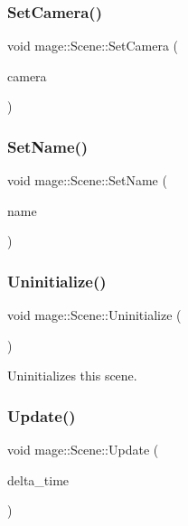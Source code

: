 \subsubsection{\texorpdfstring{Set\+Camera()}{SetCamera()}}
{\footnotesize\ttfamily void mage\+::\+Scene\+::\+Set\+Camera (\begin{DoxyParamCaption}\item[{\hyperlink{namespacemage_a1e01ae66713838a7a67d30e44c67703e}{Shared\+Ptr}$<$ \hyperlink{classmage_1_1_camera}{Camera} $>$}]{camera }\end{DoxyParamCaption})}

\hypertarget{classmage_1_1_scene_a9b7c1c2f84cc3b3c5ff3de4f29d830e9}{}\label{classmage_1_1_scene_a9b7c1c2f84cc3b3c5ff3de4f29d830e9} 
\subsubsection{\texorpdfstring{Set\+Name()}{SetName()}}
{\footnotesize\ttfamily void mage\+::\+Scene\+::\+Set\+Name (\begin{DoxyParamCaption}\item[{const string \&}]{name }\end{DoxyParamCaption})}

\hypertarget{classmage_1_1_scene_a714dc33c04dc2b8e2cec93564905b174}{}\label{classmage_1_1_scene_a714dc33c04dc2b8e2cec93564905b174} 
\subsubsection{\texorpdfstring{Uninitialize()}{Uninitialize()}}
{\footnotesize\ttfamily void mage\+::\+Scene\+::\+Uninitialize (\begin{DoxyParamCaption}{ }\end{DoxyParamCaption})}

Uninitializes this scene. \hypertarget{classmage_1_1_scene_aa10e6eafc00834f63f146589326cbfe2}{}\label{classmage_1_1_scene_aa10e6eafc00834f63f146589326cbfe2} 
\subsubsection{\texorpdfstring{Update()}{Update()}}
{\footnotesize\ttfamily void mage\+::\+Scene\+::\+Update (\begin{DoxyParamCaption}\item[{double}]{delta\+\_\+time }\end{DoxyParamCaption})}

